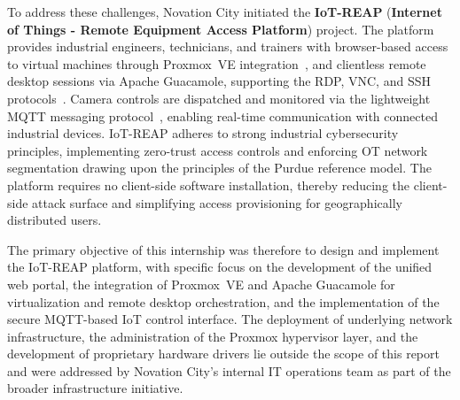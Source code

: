To address these challenges, Novation City initiated the
\textbf{IoT-REAP} (\textbf{Internet of Things - Remote Equipment Access
Platform}) project. The platform provides industrial engineers, technicians, and
trainers with browser-based access to virtual machines through Proxmox~VE
integration~{\footnotesize\cite{proxmox-ve-api}}, and clientless remote desktop sessions via
Apache Guacamole, supporting the RDP, VNC, and SSH
protocols~{\footnotesize\cite{guacamole-manual}}. Camera controls are dispatched and monitored
via the lightweight MQTT messaging protocol~{\footnotesize\cite{mqtt-oasis}}, enabling
real-time communication with connected industrial devices. IoT-REAP adheres to
strong industrial cybersecurity principles, implementing zero-trust access
controls and enforcing OT network segmentation drawing upon the principles of
the Purdue reference model. The platform requires no client-side software
installation, thereby reducing the client-side attack surface and simplifying
access provisioning for geographically distributed users.

The primary objective of this internship was therefore to design and implement
the IoT-REAP platform, with specific focus on the development of the unified
web portal, the integration of Proxmox~VE and Apache Guacamole for
virtualization and remote desktop orchestration, and the implementation of the
secure MQTT-based IoT control interface. The deployment of underlying network
infrastructure, the administration of the Proxmox hypervisor layer, and the
development of proprietary hardware drivers lie outside the scope of this report
and were addressed by Novation City's internal IT operations team as part of the
broader infrastructure initiative.

